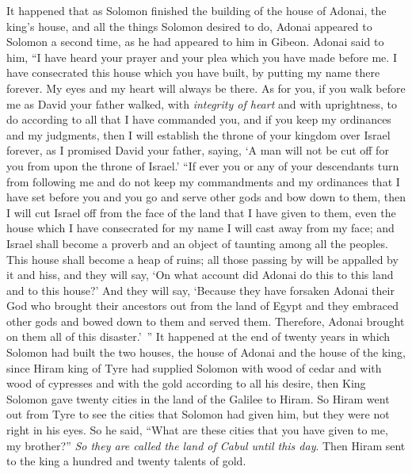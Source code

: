 \begin{biblechapter} %
 It happened that as Solomon finished the building of the house of Adonai, the king’s house, and all the things Solomon desired to do,
\verse Adonai appeared to Solomon a second time, as he had appeared to him in Gibeon.
\verse Adonai said to him, “I have heard your prayer and your plea which you have made before me. I have consecrated this house which you have built, by putting my name there forever. My eyes and my heart will always be there.
\verse As for you, if you walk before me as David your father walked, with \textit{integrity of heart} and with uprightness, to do according to all that I have commanded you, and if you keep my ordinances and my judgments,
\verse then I will establish the throne of your kingdom over Israel forever, as I promised David your father, saying, ‘A man will not be cut off for you from upon the throne of Israel.’
\verse “If ever you or any of your descendants turn from following me and do not keep my commandments and my ordinances that I have set before you and you go and serve other gods and bow down to them,
\verse then I will cut Israel off from the face of the land that I have given to them, even the house which I have consecrated for my name I will cast away from my face; and Israel shall become a proverb and an object of taunting among all the peoples.
\verse This house shall become a heap of ruins; all those passing by will be appalled by it and hiss, and they will say, ‘On what account did Adonai do this to this land and to this house?’
\verse And they will say, ‘Because they have forsaken Adonai their God who brought their ancestors out from the land of Egypt and they embraced other gods and bowed down to them and served them. Therefore, Adonai brought on them all of this disaster.’ ”
 It happened at the end of twenty years in which Solomon had built the two houses, the house of Adonai and the house of the king,
\verse since Hiram king of Tyre had supplied Solomon with wood of cedar and with wood of cypresses and with the gold according to all his desire, then King Solomon gave twenty cities in the land of the Galilee to Hiram.
\verse So Hiram went out from Tyre to see the cities that Solomon had given him, but they were not right in his eyes.
\verse So he said, “What are these cities that you have given to me, my brother?” \textit{So they are called the land of Cabul until this day}.
\verse Then Hiram sent to the king a hundred and twenty talents of gold.

\end{biblechapter}
